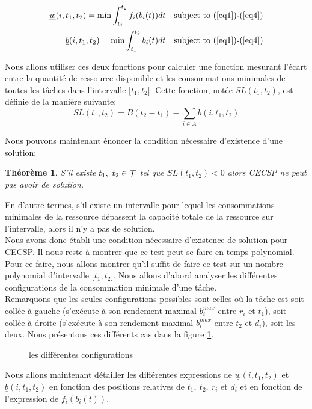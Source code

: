 \documentclass{report}
\newcommand{\bb}{\underline{b}(i,t_1,t_2)}
\newcommand{\wb}{\underline{w}(i,t_1,t_2)}
\newtheorem{Th}{Théorème}
\begin{document}
\begin{align*}
  \wb= \min \int_{t_1}^{t_2} f_i(b_i(t))dt & & \text{subject to (\ref{eq1})-(\ref{eq4})}\\
  \bb= \min \int_{t_1}^{t_2} b_i(t)dt & & \text{subject to (\ref{eq1})-(\ref{eq4})}
\end{align*}
	
Nous allons utiliser ces deux fonctions pour calculer une fonction mesurant l'écart entre la quantité de ressource disponible et les consommations minimales de toutes les tâches dans l'intervalle ${[}t_1,t_2{]}$. Cette fonction, notée $SL(t_1,t_2)$, est définie de la manière suivante:
\[ SL(t_1,t_2)=B(t_2-t_1)-\sum\limits_{i \in A} \bb \]

Nous pouvons maintenant énoncer la condition nécessaire d'existence d'une solution:

\begin{Th}
  S'il existe $t_1,\ t_2 \in {\cal T}$ tel que $SL(t_1,t_2) <0$ alors CECSP ne peut pas avoir de solution.
\end{Th}
	
En d'autre termes, s'il existe un intervalle pour lequel les consommations minimales de la ressource dépassent la capacité totale de la ressource sur l'intervalle, alors il n'y a pas de solution.\\
	
Nous avons donc établi une condition nécessaire d'existence de solution pour CECSP. Il nous reste à montrer que ce test peut se faire en temps polynomial. Pour ce faire, nous allons montrer qu'il suffit de faire ce test sur un nombre polynomial d'intervalle ${[}t_1,t_2{]}$. Nous allons d'abord analyser les différentes configurations de la consommation minimale d'une tâche.\\
Remarquons que les seules configurations possibles sont celles où la tâche est soit collée à gauche (s'exécute à son rendement maximal $b_i^{max}$ entre $r_i$ et $t_1$), soit collée à droite (s'exécute à son rendement maximal $b_i^{max}$ entre $t_2$ et $d_i$), soit les deux. Nous présentons ces différents cas dans la figure \ref{configuration}.

\begin{figure}[!h]
  
  \caption{les différentes configurations}
  \label{configuration}
\end{figure}
	

Nous allons maintenant détailler les différentes expressions de $\wb$ et $\bb$ en fonction des positions relatives de $t_1,\ t_2,\ r_i$ et $d_i$ et en fonction de l'expression de $f_i(b_i(t))$.
\end{document}
